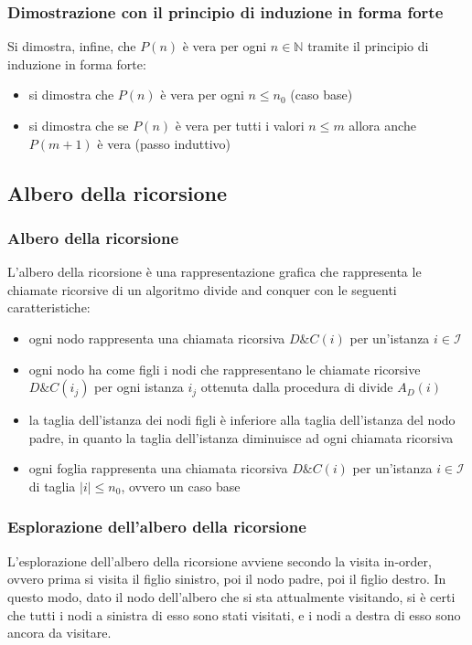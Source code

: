 \subsubsection*{Dimostrazione con il principio di induzione in forma forte}
Si dimostra, infine, che \(P(n)\) è vera per ogni \(n \in \mathbb{N}\) tramite il principio di induzione in forma forte:
\begin{itemize}
	\item si dimostra che \(P(n)\) è vera per ogni \(n \leq n_0\) (caso base)
	\item si dimostra che se \(P(n)\) è vera per tutti i valori \(n \leq m\) allora anche \(P(m + 1)\) è vera (passo induttivo)
\end{itemize}

\subsection{Albero della ricorsione}
\subsubsection*{Albero della ricorsione}
L'albero della ricorsione è una rappresentazione grafica che rappresenta le chiamate ricorsive di un algoritmo divide and
conquer con le seguenti caratteristiche:
\begin{itemize}
	\item ogni nodo rappresenta una chiamata ricorsiva \(D\&C(i)\) per un'istanza \(i \in \mathcal{I}\)
	\item ogni nodo ha come figli i nodi che rappresentano le chiamate ricorsive \(D\&C(i_j)\) per ogni istanza
	\(i_j\) ottenuta dalla procedura di divide \(A_D(i)\)
	\item la taglia dell'istanza dei nodi figli è inferiore alla taglia dell'istanza del nodo padre, in quanto la taglia
	dell'istanza diminuisce ad ogni chiamata ricorsiva
	\item ogni foglia rappresenta una chiamata ricorsiva \(D\&C(i)\) per un'istanza \(i \in \mathcal{I}\) di taglia
	\(|i| \leq n_0\), ovvero un caso base
\end{itemize}

\subsubsection*{Esplorazione dell'albero della ricorsione}
L'esplorazione dell'albero della ricorsione avviene secondo la visita in-order, ovvero prima si visita il figlio sinistro,
poi il nodo padre, poi il figlio destro. In questo modo, dato il nodo dell'albero che si sta attualmente visitando, si è
certi che tutti i nodi a sinistra di esso sono stati visitati, e i nodi a destra di esso sono ancora da visitare.

